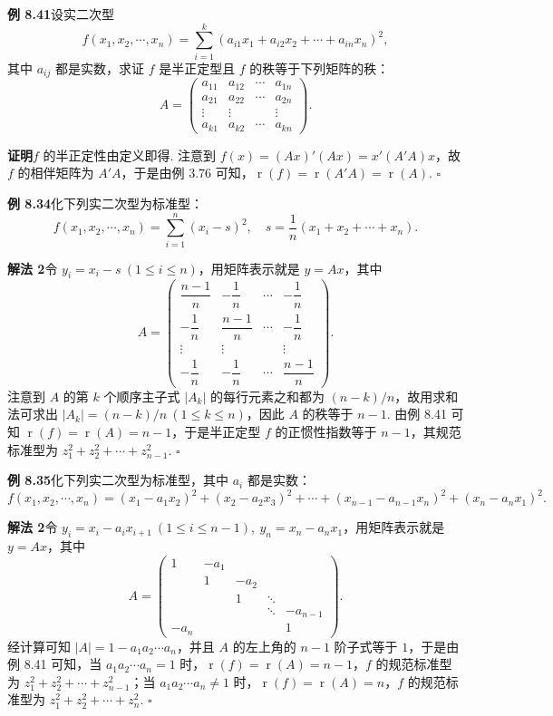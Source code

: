 \documentclass[UTF8,12pt,a4paper,fontset=fandol]{ctexart}
\begin{document}
\noindent\textbf{例 8.41}\quad 设实二次型
\[
f(x_1,x_2,\cdots,x_n)=\sum_{i=1}^k(a_{i1}x_1+a_{i2}x_2+\cdots+a_{in}x_n)^2,
\]
其中 $a_{ij}$ 都是实数，求证 $f$ 是半正定型且 $f$ 的秩等于下列矩阵的秩：
\[
A=\left(\begin{array}{cccc}
a_{11} & a_{12} & \cdots & a_{1n}\\
a_{21} & a_{22} & \cdots & a_{2n}\\
\vdots & \vdots &        & \vdots\\
a_{k1} & a_{k2} & \cdots & a_{kn}
\end{array}\right).
\]

\noindent\textbf{证明}\quad $f$ 的半正定性由定义即得. 注意到 $f(x)=(Ax)'(Ax)=x'(A'A)x$，故 $f$ 的相伴矩阵为 $A'A$，于是由例 3.76 可知，$\operatorname{r}(f)=\operatorname{r}(A'A)=\operatorname{r}(A)$. $\ensuremath{\square}$

\noindent\textbf{例 8.34}\quad 化下列实二次型为标准型：
\[
f(x_1,x_2,\cdots,x_n)=\sum_{i=1}^n(x_i-s)^2,\quad s=\frac1n(x_1+x_2+\cdots+x_n).
\]

\noindent\textbf{解法 2}\quad 令 $y_i=x_i-s\ (1\le i\le n)$，用矩阵表示就是 $y=Ax$，其中
\[
A=\left(\begin{array}{cccc}
\dfrac{n-1}{n} & -\dfrac1n & \cdots & -\dfrac1n\\
-\dfrac1n & \dfrac{n-1}{n} & \cdots & -\dfrac1n\\
\vdots & \vdots & & \vdots\\
-\dfrac1n & -\dfrac1n & \cdots & \dfrac{n-1}{n}
\end{array}\right).
\]
注意到 $A$ 的第 $k$ 个顺序主子式 $|A_k|$ 的每行元素之和都为 $(n-k)/n$，故用求和法可求出 $|A_k|=(n-k)/n\ (1\le k\le n)$，因此 $A$ 的秩等于 $n-1$. 由例 8.41 可知 $\operatorname{r}(f)=\operatorname{r}(A)=n-1$，于是半正定型 $f$ 的正惯性指数等于 $n-1$，其规范标准型为 $z_1^2+z_2^2+\cdots+z_{n-1}^2$. $\ensuremath{\square}$

\noindent\textbf{例 8.35}\quad 化下列实二次型为标准型，其中 $a_i$ 都是实数：
\[
f(x_1,x_2,\cdots,x_n)=(x_1-a_1x_2)^2+(x_2-a_2x_3)^2+\cdots+(x_{n-1}-a_{n-1}x_n)^2+(x_n-a_nx_1)^2.
\]

\noindent\textbf{解法 2}\quad 令 $y_i=x_i-a_ix_{i+1}\ (1\le i\le n-1),\ y_n=x_n-a_nx_1$，用矩阵表示就是 $y=Ax$，其中
\[
A=\left(\begin{array}{ccccc}
1 & -a_1 &        &        &   \\
  & 1    & -a_2   &        &   \\
  &      & 1      & \ddots &   \\
  &      &        & \ddots & -a_{n-1}\\
-a_n &  &        &        & 1
\end{array}\right).
\]
经计算可知 $|A|=1-a_1a_2\cdots a_n$，并且 $A$ 的左上角的 $n-1$ 阶子式等于 $1$，于是由例 8.41 可知，当 $a_1a_2\cdots a_n=1$ 时，$\operatorname{r}(f)=\operatorname{r}(A)=n-1$，$f$ 的规范标准型为 $z_1^2+z_2^2+\cdots+z_{n-1}^2$；当 $a_1a_2\cdots a_n\ne 1$ 时，$\operatorname{r}(f)=\operatorname{r}(A)=n$，$f$ 的规范标准型为 $z_1^2+z_2^2+\cdots+z_n^2$. $\ensuremath{\square}$
\end{document}
